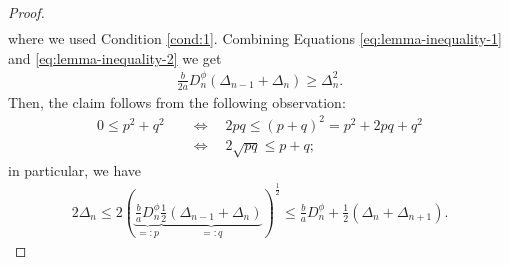 \documentclass[onecolumn,final,a4paper,13pt,reqno]{siamart}
\begin{document}
\begin{proof}
\begin{align}
	\end{align}
	where we used Condition \ref{cond:1}. Combining Equations \eqref{eq:lemma-inequality-1} and \eqref{eq:lemma-inequality-2} we get
	\begin{align}
		\frac{b}{2a}D_n^\phi(\Delta_{n - 1} + \Delta_n) \geq \Delta_n^2.
	\end{align}
	Then, the claim follows from the following observation:
	\begin{align}
		0 \leq p^2 + q^2 \quad&\Leftrightarrow\quad 2pq \leq (p + q)^2 = p^2 + 2pq + q^2\\
		&\Leftrightarrow\quad 2\sqrt{pq} \leq p + q;
	\end{align}
	in particular, we have
	\begin{align}
		2 \Delta_n \leq 2 (\underbrace{\frac{b}{a}D_n^\phi}_{=:p} \underbrace{\frac{1}{2}(\Delta_{n - 1} + \Delta_n)}_{=:q})^{\frac{1}{2}} \leq \frac{b}{a} D_n^\phi + \frac{1}{2}(\Delta_n + \Delta_{n + 1}).
	\end{align}
	

\end{proof}
\end{document}
